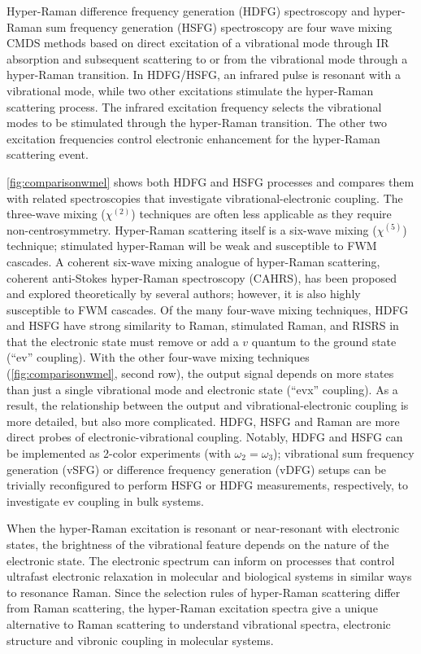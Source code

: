 \documentclass[aip, jcp, reprint, onecolumn]{revtex4-2}
\begin{document}
Hyper-Raman difference frequency generation (HDFG) spectroscopy and hyper-Raman sum frequency generation (HSFG) spectroscopy are four wave mixing CMDS methods based on direct excitation of a vibrational mode through IR absorption and subsequent scattering to or from the vibrational mode through a hyper-Raman transition.
In HDFG/HSFG, an infrared pulse is resonant with a vibrational mode, while two other excitations stimulate the hyper-Raman scattering process.
The infrared excitation frequency selects the vibrational modes to be stimulated through the hyper-Raman transition.
The other two excitation frequencies control electronic enhancement for the hyper-Raman scattering event.

\autoref{fig:comparisonwmel} shows both HDFG and HSFG processes and compares them with related spectroscopies that investigate vibrational-electronic coupling.
The three-wave mixing ($\chi^{(2)}$) techniques are often less applicable as they require non-centrosymmetry.\cite{RN227}
Hyper-Raman scattering itself is a six-wave mixing ($\chi^{(5)}$) technique; stimulated hyper-Raman will be weak and susceptible to FWM cascades.\cite{RN515, RN243, Cho2000_Cascade}
A coherent six-wave mixing analogue of hyper-Raman scattering, coherent anti-Stokes hyper-Raman spectroscopy (CAHRS), has been proposed and explored theoretically by several authors; however, it is also highly susceptible to FWM cascades.\cite{Berger1978, Bjarnason1980, Cho1997, Cho1998}
Of the many four-wave mixing techniques, HDFG and HSFG have strong similarity to Raman, stimulated Raman, and RISRS in that the electronic state must remove or add a $v$ quantum to the ground state (``ev'' coupling). %
With the other four-wave mixing techniques (\autoref{fig:comparisonwmel}, second row), the output signal depends on more states than just a single vibrational mode and electronic state (``evx'' coupling). 
As a result, the relationship between the output and vibrational-electronic coupling is more detailed, but also more complicated.
HDFG, HSFG and Raman are more direct probes of electronic-vibrational coupling.
Notably, HDFG and HSFG can be implemented as 2-color experiments (with $\omega_2=\omega_3$);\cite{Cho2001} vibrational sum frequency generation (vSFG) or difference frequency generation (vDFG) setups can be trivially reconfigured to perform HSFG or HDFG measurements, respectively, to investigate ev coupling in bulk systems.

When the hyper-Raman excitation is resonant or near-resonant with electronic states, the brightness of the vibrational feature depends on the nature of the electronic state.
The electronic spectrum can inform on processes that control ultrafast electronic relaxation in molecular and biological systems in similar ways to resonance Raman.\cite{Bredenbeck2015, Arsenault2021}
Since the selection rules of hyper-Raman scattering differ from Raman scattering, the hyper-Raman excitation spectra give a unique alternative to Raman scattering to understand vibrational spectra, electronic structure and vibronic coupling in molecular systems. \cite{Olson2018}
\end{document}
